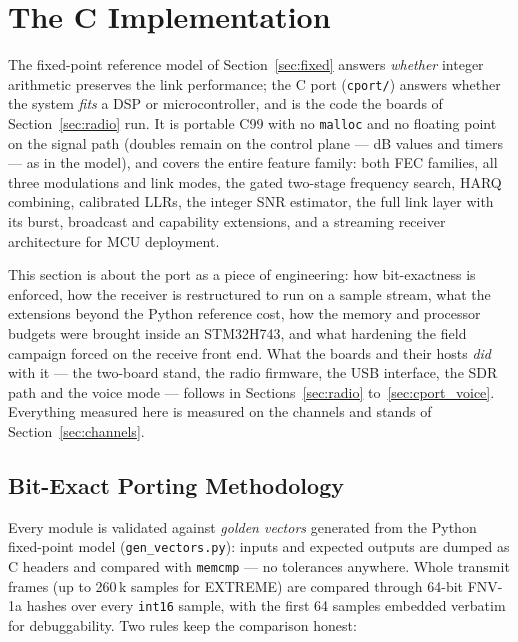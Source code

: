 \section{The C Implementation}
\label{sec:cport}

The fixed-point reference model of Section~\ref{sec:fixed} answers
\emph{whether} integer arithmetic preserves the link performance; the C
port (\texttt{cport/}) answers whether the system \emph{fits} a DSP or
microcontroller, and is the code the boards of Section~\ref{sec:radio}
run.  It is portable C99 with no \texttt{malloc} and no floating point
on the signal path (doubles remain on the control plane --- dB values
and timers --- as in the model), and covers the entire feature family:
both FEC families, all three modulations and link modes, the gated
two-stage frequency search, HARQ combining, calibrated LLRs, the
integer SNR estimator, the full link layer with its burst, broadcast
and capability extensions, and a streaming receiver architecture for
MCU deployment.

This section is about the port as a piece of engineering: how
bit-exactness is enforced, how the receiver is restructured to run on a
sample stream, what the extensions beyond the Python reference cost,
how the memory and processor budgets were brought inside an STM32H743,
and what hardening the field campaign forced on the receive front end.
What the boards and their hosts \emph{did} with it --- the two-board
stand, the radio firmware, the USB interface, the SDR path and the
voice mode --- follows in Sections~\ref{sec:radio}
to~\ref{sec:cport_voice}.  Everything measured here is measured on the
channels and stands of Section~\ref{sec:channels}.

\subsection{Bit-Exact Porting Methodology}
\label{sec:cport_method}

Every module is validated against \emph{golden vectors} generated from
the Python fixed-point model (\texttt{gen\_vectors.py}): inputs and
expected outputs are dumped as C headers and compared with
\texttt{memcmp} --- no tolerances anywhere.  Whole transmit frames
(up to 260\,k samples for EXTREME) are compared through 64-bit
FNV-1a hashes over every \texttt{int16} sample, with the first 64
samples embedded verbatim for debuggability.  Two rules keep the
comparison honest:

